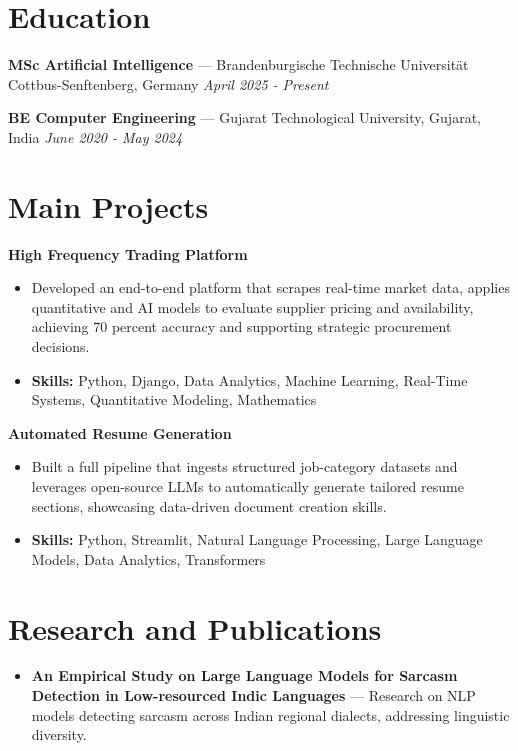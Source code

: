 \documentclass[a4paper,10pt]{article}
\begin{document}
\section*{Education}
\textbf{MSc Artificial Intelligence} — Brandenburgische Technische Universität Cottbus-Senftenberg, Germany \hfill \textit{April 2025 - Present}\par
\vspace{1.5pt}
\textbf{BE Computer Engineering} — Gujarat Technological University, Gujarat, India \hfill \textit{June 2020 - May 2024}\par

\section*{Main Projects}
\textbf{High Frequency Trading Platform}\par
\vspace{1pt}
\begin{itemize}
  \item Developed an end-to-end platform that scrapes real-time market data, applies quantitative and AI models to evaluate supplier pricing and availability, achieving 70 percent accuracy and supporting strategic procurement decisions.
  \item \textbf{Skills:} Python, Django, Data Analytics, Machine Learning, Real-Time Systems, Quantitative Modeling, Mathematics
\end{itemize}
\vspace{3pt}
\textbf{Automated Resume Generation}\par
\vspace{1pt}
\begin{itemize}
  \item Built a full pipeline that ingests structured job-category datasets and leverages open-source LLMs to automatically generate tailored resume sections, showcasing data-driven document creation skills.
  \item \textbf{Skills:} Python, Streamlit, Natural Language Processing, Large Language Models, Data Analytics, Transformers
\end{itemize}

\section*{Research and Publications}
\begin{itemize}
\item \textbf{An Empirical Study on Large Language Models for Sarcasm Detection in Low-resourced Indic Languages} — Research on NLP models detecting sarcasm across Indian regional dialects, addressing linguistic diversity.
\end{itemize}
\end{document}

